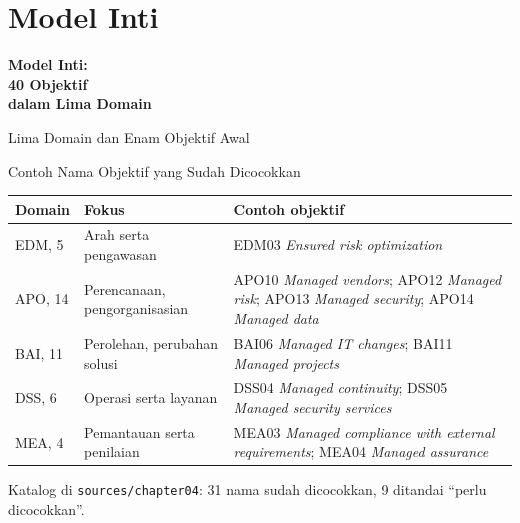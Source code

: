 \documentclass[aspectratio=169, table, 12pt]{beamer}
\begin{document}
\section{Model Inti}

\begin{frame}{\hfill}
  \centering
  \Huge{\textbf{Model Inti:\\40 Objektif\\dalam Lima Domain}}
\end{frame}

\begin{frame}{{\Large Lima Domain dan Enam Objektif Awal}}
  \centering
  \vspace{2pt}
  
\end{frame}

\begin{frame}{{\Large Contoh Nama Objektif yang Sudah Dicocokkan}}
  \vspace{2pt}
  \scriptsize
  \begin{tabularx}{\textwidth}{|>{\raggedright\arraybackslash}p{}|>{\raggedright\arraybackslash}p{}|>{\raggedright\arraybackslash}X|}
    \hline
    \textbf{Domain} & \textbf{Fokus} & \textbf{Contoh objektif} \\ \hline
    EDM, 5 & Arah serta pengawasan & EDM03 \textit{Ensured risk optimization} \\ \hline
    APO, 14 & Perencanaan, pengorganisasian & APO10 \textit{Managed vendors}; APO12 \textit{Managed risk}; APO13 \textit{Managed security}; APO14 \textit{Managed data} \\ \hline
    BAI, 11 & Perolehan, perubahan solusi & BAI06 \textit{Managed IT changes}; BAI11 \textit{Managed projects} \\ \hline
    DSS, 6 & Operasi serta layanan & DSS04 \textit{Managed continuity}; DSS05 \textit{Managed security services} \\ \hline
    MEA, 4 & Pemantauan serta penilaian & MEA03 \textit{Managed compliance with external requirements}; MEA04 \textit{Managed assurance} \\ \hline
  \end{tabularx}

  \vspace{6pt}
  \small Katalog di \texttt{sources/chapter04}: 31 nama sudah dicocokkan, 9 ditandai ``perlu dicocokkan''.
\end{frame}
\end{document}
